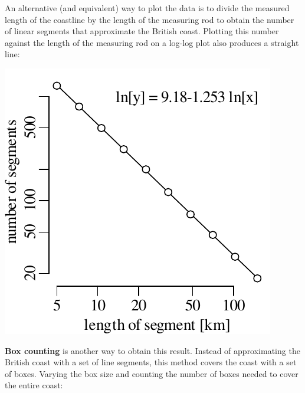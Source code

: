 An alternative (and equivalent) way to plot the data is to divide the
measured length of the coastline by the length of the measuring rod to
obtain the number of linear segments that approximate the British
coast.  Plotting this number against the length of the measuring rod
on a log-log plot also produces a straight line:

\noindent\begin{minipage}[t][][b]{.3\textwidth}
  \includegraphics[width=\textwidth]{../figures/fractaldimbritain.pdf}\medskip
\end{minipage}
\begin{minipage}[t][][t]{.7\textwidth}
  \label{fig:fractaldimbritain}
\end{minipage}

\textbf{Box counting} is another way to obtain this result. Instead of
approximating the British coast with a set of line segments, this
method covers the coast with a set of boxes. Varying the box size and
counting the number of boxes needed to cover the entire coast:\medskip

